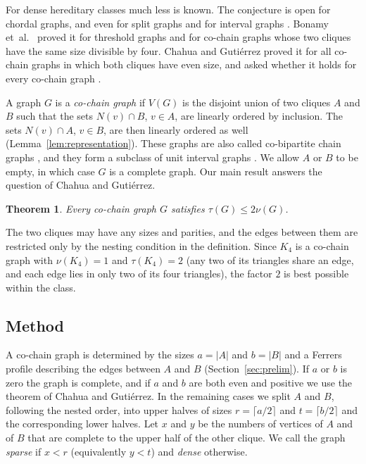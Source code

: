 \documentclass{amsart}
\newtheorem{theorem}{Theorem}[section]
\theoremstyle{definition}
\numberwithin{equation}{section}
\numberwithin{table}{section}
\begin{document}
For dense hereditary classes much less is known. The conjecture is open for chordal graphs, and even for split graphs and for interval graphs \cite{BBG22,CG23}. Bonamy et~al.\ \cite{BBG22} proved it for threshold graphs and for co-chain graphs whose two cliques have the same size divisible by four. Chahua and Guti\'errez \cite{CG23} proved it for all co-chain graphs in which both cliques have even size, and asked whether it holds for every co-chain graph \cite[Section~4, Question~1]{CG23}.

A graph $G$ is a \emph{co-chain graph} if $V(G)$ is the disjoint union of two cliques $A$ and $B$ such that the sets $N(v)\cap B$, $v\in A$, are linearly ordered by inclusion. The sets $N(v)\cap A$, $v\in B$, are then linearly ordered as well (Lemma~\ref{lem:representation}). These graphs are also called co-bipartite chain graphs \cite{BES18,HK07}, and they form a subclass of unit interval graphs \cite{BLS99,CG23}. We allow $A$ or $B$ to be empty, in which case $G$ is a complete graph. Our main result answers the question of Chahua and Guti\'errez.

\begin{theorem}\label{thm:main}
Every co-chain graph $G$ satisfies $\tau(G)\le 2\nu(G)$.
\end{theorem}

The two cliques may have any sizes and parities, and the edges between them are restricted only by the nesting condition in the definition. Since $K_4$ is a co-chain graph with $\nu(K_4)=1$ and $\tau(K_4)=2$ (any two of its triangles share an edge, and each edge lies in only two of its four triangles), the factor $2$ is best possible within the class.

\subsection*{Method}
A co-chain graph is determined by the sizes $a=|A|$ and $b=|B|$ and a Ferrers profile describing the edges between $A$ and $B$ (Section~\ref{sec:prelim}). If $a$ or $b$ is zero the graph is complete, and if $a$ and $b$ are both even and positive we use the theorem of Chahua and Guti\'errez. In the remaining cases we split $A$ and $B$, following the nested order, into upper halves of sizes $r=\lceil a/2\rceil$ and $t=\lceil b/2\rceil$ and the corresponding lower halves. Let $x$ and $y$ be the numbers of vertices of $A$ and of $B$ that are complete to the upper half of the other clique. We call the graph \emph{sparse} if $x<r$ (equivalently $y<t$) and \emph{dense} otherwise.
\end{document}
